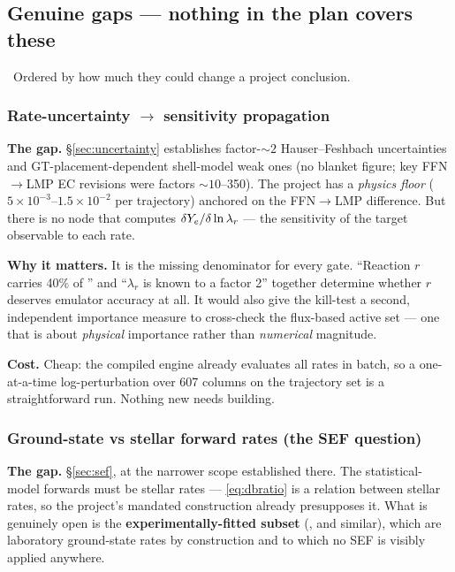 \subsection{Genuine gaps --- nothing in the plan covers these}
\label{sec:gaps}

\begin{warn}
\warnglyph{}~Ordered by how much they could change a project conclusion.
\end{warn}

\subsubsection{Rate-uncertainty \texorpdfstring{$\to$}{->} \texorpdfstring{\Ye}{Ye} sensitivity propagation}
\label{sec:gap-sensitivity}

\textbf{The gap.} \S\ref{sec:uncertainty} establishes factor-${\sim}2$
Hauser--Feshbach uncertainties and GT-placement-dependent shell-model weak ones
(no blanket figure; key FFN$\to$LMP EC revisions were factors
${\sim}10$--350). The project has a \Ye{} \emph{physics floor}
($5\times10^{-3}$--$1.5\times10^{-2}$ per trajectory) anchored on the
FFN$\to$LMP difference. But there is no node that computes
\textbf{$\delta Y_{e}/\delta\ln\lambda_r$} --- the sensitivity of the target
observable to each rate.

\textbf{Why it matters.} It is the missing denominator for every gate.
``Reaction $r$ carries 40\% of \dYe'' and ``$\lambda_r$ is known to a factor 2''
together determine whether $r$ deserves emulator accuracy at all. It would also
give the kill-test a second, independent importance measure to cross-check the
flux-based active set --- one that is about \emph{physical} importance rather
than \emph{numerical} magnitude.

\textbf{Cost.} Cheap: the compiled engine already evaluates all rates in batch,
so a one-at-a-time log-perturbation over 607 columns on the trajectory set is a
straightforward run. Nothing new needs building.

\subsubsection{Ground-state vs stellar forward rates (the SEF question)}
\label{sec:gap-sef}

\textbf{The gap.} \S\ref{sec:sef}, at the narrower scope established there. The
 statistical-model forwards must be stellar rates ---
\eqref{eq:dbratio} is a relation between stellar rates, so the project's
mandated  construction already presupposes it.
What is genuinely open is the \textbf{experimentally-fitted subset}
(,  and similar), which are laboratory ground-state rates
by construction and to which no SEF is visibly applied anywhere.

